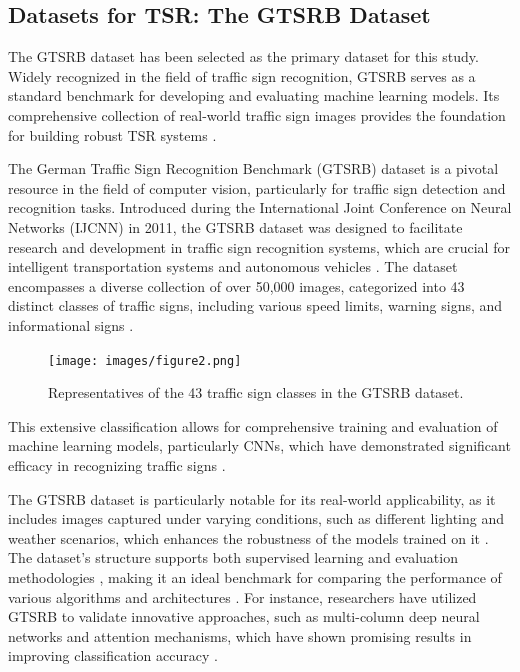  \subsection{Datasets for TSR: The GTSRB Dataset}

 The \ac{GTSRB} dataset has been selected as the primary dataset for this study.
  Widely recognized in the field of traffic sign recognition, GTSRB serves as a standard benchmark for developing and evaluating
   machine learning models. Its comprehensive collection of real-world traffic sign images provides the foundation for building
    robust TSR systems \cite{STALLKAMP2012323}.


    The German Traffic Sign Recognition Benchmark (GTSRB) dataset is a pivotal resource in the field of computer vision,
     particularly for traffic sign detection and recognition tasks. Introduced during the International Joint Conference
      on Neural Networks (IJCNN) in 2011, the GTSRB dataset was designed to facilitate research and development in traffic 
      sign recognition systems, which are crucial for intelligent transportation systems and autonomous vehicles
       \cite{10.1109/tits.2012.2209421}. The dataset encompasses a diverse collection of over 50,000 images, 
       categorized into 43 distinct classes of traffic signs, including various speed limits, warning signs,
        and informational signs \cite{10.1016/j.neunet.2012.02.023}. 

        \begin{figure}[H]
          \centering
          \texttt{[image: images/figure2.png]}
          \caption{Representatives of the 43 traffic sign classes in the GTSRB dataset.}
          \label{fig:fig2}
      \end{figure}
        
        This extensive classification allows for comprehensive training and evaluation of machine learning models,
         particularly \ac{CNNs}, which have demonstrated significant efficacy in recognizing traffic signs 
         \cite{10.3390/a10040127}.

    The GTSRB dataset is particularly notable for its real-world applicability, as it includes images captured under varying
     conditions, such as different lighting and weather scenarios, which enhances the robustness of the models trained on 
     it \cite{10.18178/wcse.2019.06.020}. The dataset's structure supports both supervised learning and evaluation methodologies
     , making it an ideal benchmark for comparing the performance of various algorithms and architectures 
     \cite{10.18280/isi.250211}. For instance, researchers have utilized GTSRB to validate innovative approaches, such as multi-column deep neural networks and attention mechanisms, which have shown promising results in improving classification accuracy \cite{10.1016/j.neunet.2012.02.023,10.1109/icde48307.2020.00079}.
    

